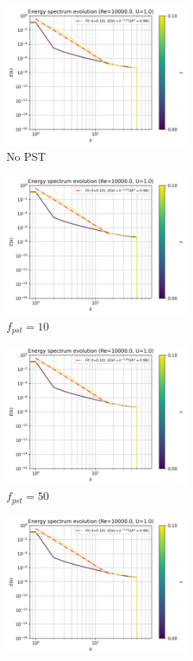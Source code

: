 \begin{figure}[H]
  \begin{subfigure}{7cm}
    \centering\includegraphics[width=6cm]{Code-Figures/okra2022/pst/c0_20_tait_pec_dtmul_1_nx_100_pst_-1_re_10000_ok2022/energy_spectrum_evolution.png}
    \caption{No PST}
  \end{subfigure}
  \begin{subfigure}{7cm}
    \centering\includegraphics[width=6cm]{Code-Figures/okra2022/pst/c0_20_tait_pec_dtmul_1_nx_100_pst_10_re_10000_ok2022/energy_spectrum_evolution.png}
    \caption{$f_{pst} = 10$}
  \end{subfigure}
  \begin{subfigure}{7cm}
    \centering\includegraphics[width=6cm]{Code-Figures/okra2022/pst/c0_20_tait_pec_dtmul_1_nx_100_pst_50_re_10000_ok2022/energy_spectrum_evolution.png}
    \caption{$f_{pst} = 50$}
  \end{subfigure}
  \begin{subfigure}{7cm}
    \centering\includegraphics[width=6cm]{Code-Figures/okra2022/pst/c0_20_tait_pec_dtmul_1_nx_100_pst_100_re_10000_ok2022/energy_spectrum_evolution.png}

\end{subfigure}
\end{figure}
